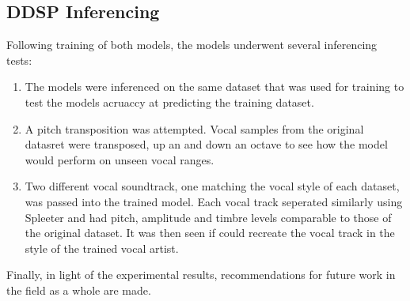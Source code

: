 \subsection{DDSP Inferencing}

Following training of both models, the models underwent several inferencing tests:

\begin{enumerate}
    \item The models were inferenced on the same dataset that was used for training to test the models acruaccy at predicting the training dataset.
    \item A pitch transposition was attempted. Vocal samples from the original datasret were transposed, up an and down an octave to see how the model would perform on unseen vocal ranges.
    \item Two different vocal soundtrack, one matching the vocal style of each dataset, was passed into the trained model. Each vocal track seperated similarly using Spleeter and had pitch, amplitude and timbre levels comparable to those of the original dataset. It was then seen if could recreate the vocal track in the style of the trained vocal artist. 
\end{enumerate}

Finally, in light of the experimental results, recommendations for future work in the field as a whole are made.